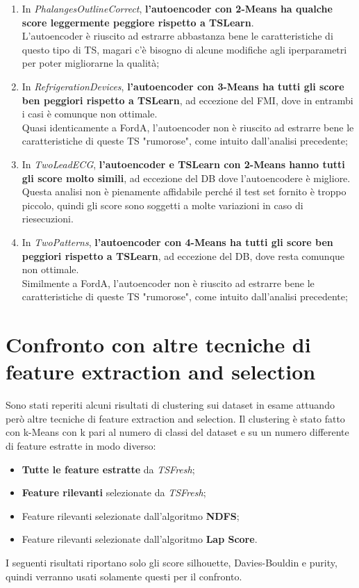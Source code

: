 \begin{enumerate}
	\item In \textit{PhalangesOutlineCorrect}, \textbf{l'autoencoder con 2-Means ha qualche score leggermente peggiore rispetto a TSLearn}.\\
	L'autoencoder è riuscito ad estrarre abbastanza bene le caratteristiche di questo tipo di TS, magari c'è bisogno di alcune modifiche agli iperparametri per poter migliorarne la qualità;

	\item In \textit{RefrigerationDevices}, \textbf{l'autoencoder con 3-Means ha tutti gli score ben peggiori rispetto a TSLearn}, ad eccezione del FMI, dove in entrambi i casi è comunque non ottimale.\\
	Quasi identicamente a FordA, l'autoencoder non è riuscito ad estrarre bene le caratteristiche di queste TS "rumorose", come intuito dall'analisi precedente;

	\item In \textit{TwoLeadECG}, \textbf{l'autoencoder e TSLearn con 2-Means hanno tutti gli score molto simili}, ad eccezione del DB dove l'autoencodere è migliore.\\
	Questa analisi non è pienamente affidabile perché il test set fornito è troppo piccolo, quindi gli score sono soggetti a molte variazioni in caso di riesecuzioni.

	\item In \textit{TwoPatterns}, \textbf{l'autoencoder con 4-Means ha tutti gli score ben peggiori rispetto a TSLearn}, ad eccezione del DB, dove resta comunque non ottimale.\\
	Similmente a FordA, l'autoencoder non è riuscito ad estrarre bene le caratteristiche di queste TS "rumorose", come intuito dall'analisi precedente;
\end{enumerate}

\section{Confronto con altre tecniche di feature extraction and selection}
Sono stati reperiti alcuni risultati di clustering sui dataset in esame attuando però altre tecniche di feature extraction and selection. Il clustering è stato fatto con k-Means con k pari al numero di classi del dataset e su un numero differente di feature estratte in modo diverso:
\begin{itemize}
	\item \textbf{Tutte le feature estratte} da \textit{TSFresh};
	\item \textbf{Feature rilevanti} selezionate da \textit{TSFresh};
	\item Feature rilevanti selezionate dall'algoritmo \textbf{NDFS};
	\item Feature rilevanti selezionate dall'algoritmo \textbf{Lap Score}.
\end{itemize}
I seguenti risultati riportano solo gli score silhouette, Davies-Bouldin e purity, quindi verranno usati solamente questi per il confronto.

